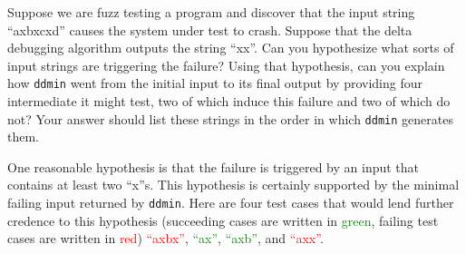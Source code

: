 \documentclass[addpoints, answers]{exam}
\newcommand{\Code}[1]{\texttt{#1}}
\begin{document}
\begin{questions}
\question[5] Suppose we are fuzz testing a program and discover that the
  input string ``axbxcxd'' causes the system under test to
  crash. Suppose that the delta debugging algorithm outputs the string
  ``xx''. Can you hypothesize what sorts of input strings are
  triggering the failure? Using that hypothesis, can you explain how
  \Code{ddmin} went from the initial input to its final output by
  providing four intermediate it might test, two of which induce this
  failure and two of which do not? Your answer should list these
  strings in the order in which \Code{ddmin} generates them.
  \begin{solution} %
    One reasonable hypothesis is that the failure is triggered by an
    input that contains at least two ``x''s. This hypothesis is
    certainly supported by the minimal failing input returned by
    \Code{ddmin}.  Here are four test cases that would lend further
    credence to this hypothesis (succeeding cases are written in
    \textcolor{green}{green}, failing test cases are written in
    \textcolor{red}{red}) \textcolor{red}{``axbx''},
    \textcolor{green}{``ax''}, \textcolor{green}{``axb''}, and
    \textcolor{red}{``axx''}.
  \end{solution}

\newpage


\end{questions}
\end{document}
